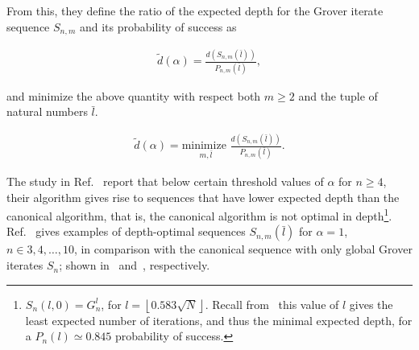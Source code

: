 \noindent
From this, they define the ratio of the expected depth for the Grover iterate sequence $S_{n,m}$ and its probability of success as 

\begin{align}
	\tilde{d}(\alpha) = \frac{d(S_{n,m}(\bar{l}))}{P_{n,m}(\bar{l})},
\end{align}

\noindent
and minimize the above quantity with respect both $m \geq 2$ and the tuple of natural numbers $\bar{l}$.

\begin{align}
	\tilde{d}(\alpha) = \underset{m, \bar{l}}{\text{minimize }}\frac{d(S_{n,m}(\bar{l}))}{P_{n,m}(\bar{l})}.
\end{align}

\noindent
The study in Ref.~\cite{Zhang_2020} report that below certain threshold values of $\alpha$ for $n\geq4$, their algorithm gives rise to sequences that have lower expected depth than the canonical algorithm, that is, the canonical algorithm is not optimal in depth\footnote[][-25pt]{${S_{n}(l,0) = G_n^l}$, for ${l = \left\lfloor 0.583 \sqrt{N} \right\rfloor}$. Recall from~ this value of $l$ gives the least expected number of iterations, and thus the minimal expected depth, for a ${P_{n}(l) \simeq 0.845}$ probability of success.}. Ref.~\cite{Zhang_2020} gives examples of depth-optimal sequences $S_{n,m}(\bar{l})$ for $\alpha=1$, $n \in {3,4,\ldots, 10}$, in comparison with the canonical sequence with only global Grover iterates $S_{n}$; shown in~ and~, respectively.

